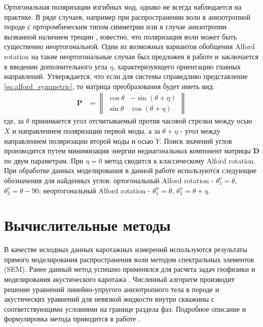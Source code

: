 \documentclass[a4paper,11pt]{article}
\begin{document}
Ортогональная поляризации изгибных мод, однако не всегда наблюдается на практике. В ряде случаев, например при распространении волн в анизотропной породе с орторомбическим типом симметрии \cite{Dellinger2001} или в случае анизотропии вызванной наличием трещин \cite{Nolte1996}, известно, что поляризация волн может быть существенно неортогональной. Один из возможных вариантов обобщения Alford rotation на такие неортогональные случаи был предложен в работе \cite{Dellinger1998} и заключается в введении дополнительного угла $\eta$, характеризующего ориентацию главных направлений. Утверждается, что если для системы справедливо представление \eqref{eq:alford_symmetric}, то матрица преобразования будет иметь вид:
\begin{align*}
\mathbf{P} &= \left\|
\begin{array}{cc}
\cos \theta & -\sin (\theta+\eta) \\ 
\sin \theta & \cos (\theta+\eta)
\end{array} 
\right\|
\end{align*}
где, за $\theta$ принимается угол отсчитываемый против часовой стрелки между осью $X$ и направлением поляризации первой моды, а за $\theta + \eta$ - угол между направлением поляризации второй моды и осью $Y$. Поиск значений углов производится путем минимизация энергии недиагональных компонент матрицы $\mathbf{D}$ по двум параметрам. При $\eta=0$ метод сводится к классическому Alford rotation. При обработке данных моделирования в данной работе используются следующие обозначения для найденных углов: ортогональный Alford rotation - $\theta_1^o=\theta$, $\theta_2^o=\theta-90$; неортогональный Alford rotation - $\theta_1^n=\theta$, $\theta_2^n=\theta+\eta$. 


\section{Вычислительные методы}

В качестве исходных данных каротажных измерений используются результаты прямого моделирования распространения волн методом спектральных элементов (SEM). Ранее данный метод успешно применялся для расчета задач геофизики \cite{Komatitsch1999} и моделирования акустического каротажа \cite{Charara2011}. Численный алгоритм производит решение уравнений линейно-упругого анизотропного тела в породе и акустических уравнений для невязкой жидкости внутри скважины с соответствующими условиями на границе раздела фаз. Подробное описание и формулировка метода приводится в работе \cite{Komatitsch1999}. %
\end{document}
